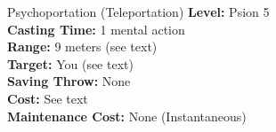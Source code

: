 {Psychoportation (Teleportation)}
{
	\textbf{Level:}
	Psion 5\\
	\textbf{Casting Time:}
	1 mental action\\
	\textbf{Range:}
	9 meters (see text)\\
	\textbf{Target:}
	You (see text)\\
	\textbf{Saving Throw:}
	None\\
	\textbf{Cost:}
	See text\\
	\textbf{Maintenance Cost:}
	None (Instantaneous)\\
}
